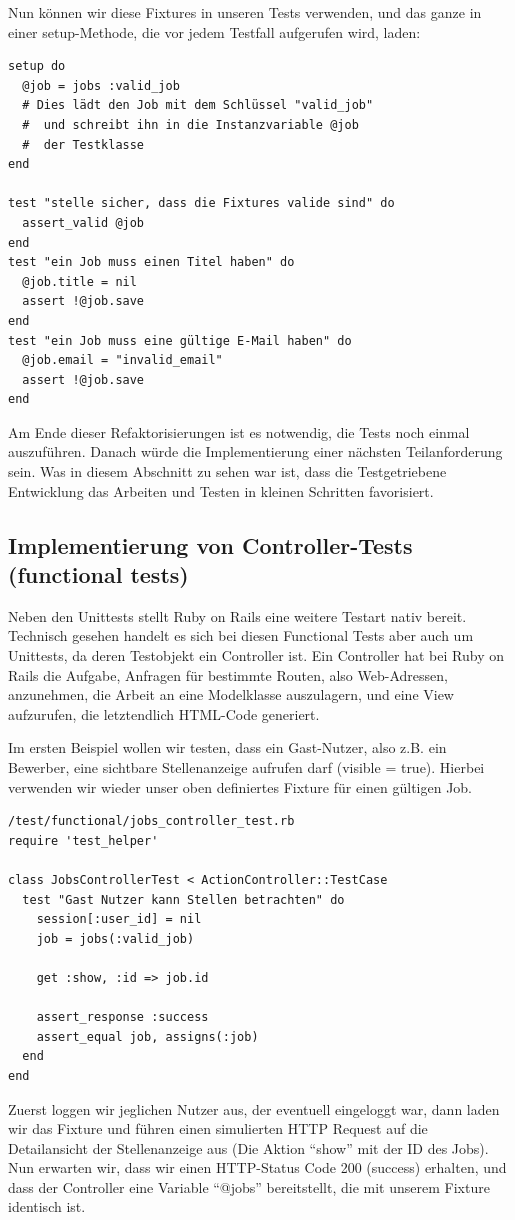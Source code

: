 Nun können wir diese Fixtures in unseren Tests verwenden, und das ganze in einer setup-Methode, die vor jedem Testfall aufgerufen wird, laden:
\begin{lstlisting}
setup do
  @job = jobs :valid_job
  # Dies lädt den Job mit dem Schlüssel "valid_job"
  #  und schreibt ihn in die Instanzvariable @job
  #  der Testklasse 
end

test "stelle sicher, dass die Fixtures valide sind" do
  assert_valid @job
end
test "ein Job muss einen Titel haben" do
  @job.title = nil
  assert !@job.save
end
test "ein Job muss eine gültige E-Mail haben" do
  @job.email = "invalid_email"
  assert !@job.save
end
\end{lstlisting}
\tddrefactor
Am Ende dieser Refaktorisierungen ist es notwendig, die Tests noch einmal auszuführen.
Danach würde die Implementierung einer nächsten Teilanforderung sein. Was in diesem Abschnitt zu sehen war ist, dass die Testgetriebene Entwicklung das Arbeiten und Testen in kleinen Schritten favorisiert.
\tddgreen

\subsection{Implementierung von Controller-Tests (functional tests)}

Neben den Unittests stellt Ruby on Rails eine weitere Testart nativ bereit. Technisch gesehen handelt es sich bei diesen Functional Tests aber auch um Unittests, da deren Testobjekt ein Controller ist. 
Ein Controller hat bei Ruby on Rails die Aufgabe, Anfragen für bestimmte Routen, also Web-Adressen, anzunehmen, die Arbeit an eine Modelklasse auszulagern, und eine View aufzurufen, die letztendlich HTML-Code generiert.

Im ersten Beispiel wollen wir testen, dass ein Gast-Nutzer, also z.B. ein Bewerber, eine sichtbare Stellenanzeige aufrufen darf (visible = true). Hierbei verwenden wir wieder unser oben definiertes Fixture für einen gültigen Job.
\begin{lstlisting}
/test/functional/jobs_controller_test.rb 
require 'test_helper'

class JobsControllerTest < ActionController::TestCase
  test "Gast Nutzer kann Stellen betrachten" do
    session[:user_id] = nil
    job = jobs(:valid_job)
    
    get :show, :id => job.id
    
    assert_response :success
    assert_equal job, assigns(:job)
  end
end
\end{lstlisting}
\tddred
Zuerst loggen wir jeglichen Nutzer aus, der eventuell eingeloggt war, dann laden wir das Fixture und führen einen simulierten HTTP Request auf die Detailansicht der Stellenanzeige aus (Die Aktion "`show"' mit der ID des Jobs).
Nun erwarten wir, dass wir einen HTTP-Status Code 200 (success) erhalten, und dass der Controller eine Variable "`@jobs"' bereitstellt, die mit unserem Fixture identisch ist.

